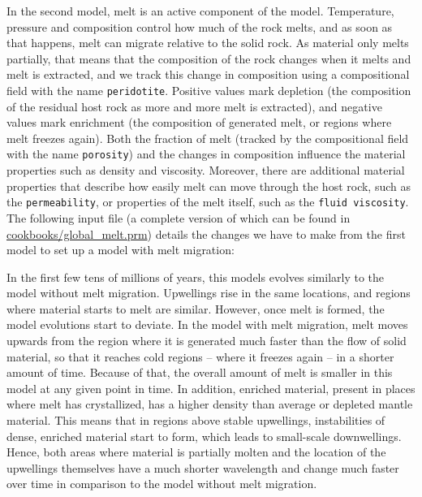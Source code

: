 \documentclass{article}
\begin{document}
In the second model, melt is an active component of the model. Temperature, pressure and composition control how much of the rock melts, and as soon as that happens, melt can migrate relative to the solid rock. As material only melts partially, that means that the composition of the rock changes when it melts and melt is extracted, and we track this change in composition using a compositional field with the name \texttt{peridotite}. Positive values mark depletion (the composition of the residual host rock as more and more melt is extracted), and negative values mark enrichment (the composition of generated melt, or regions where melt freezes again). Both the fraction of melt (tracked by the compositional field with the name \texttt{porosity}) and the changes in composition influence the material properties such as density and viscosity. Moreover, there are additional material properties that describe how easily melt can move through the host rock, such as the \texttt{permeability}, or properties of the melt itself, such as the \texttt{fluid viscosity}. 
The following input file (a complete version of which can be found in \url{cookbooks/global_melt.prm}) details the changes we have to make from the first model to set up a model with melt migration:



In the first few tens of millions of years, this models evolves similarly to the model without melt migration. Upwellings rise in the same locations, and regions where material starts to melt are similar. However, once melt is formed, the model evolutions start to deviate. In the model with melt migration, melt moves upwards from the region where it is generated much faster than the flow of solid material, so that it reaches cold regions -- where it freezes again -- in a shorter amount of time. Because of that, the overall amount of melt is smaller in this model at any given point in time. In addition, enriched material, present in places where melt has crystallized, has a higher density than average or depleted mantle material. This means that in regions above stable upwellings, instabilities of dense, enriched material start to form, which leads to small-scale downwellings. Hence, both areas where material is partially molten and the location of the upwellings themselves have a much shorter wavelength and change much faster over time in comparison to the model without melt migration.
\end{document}
